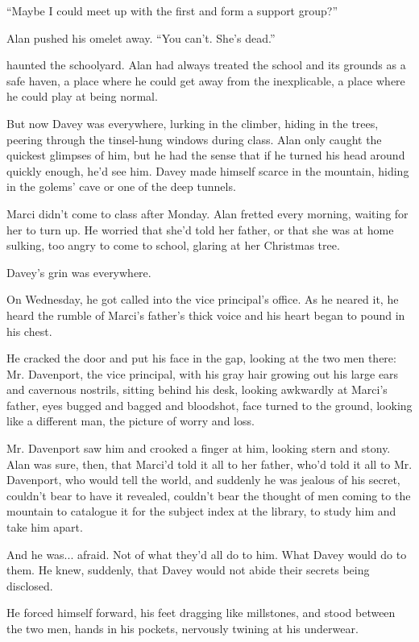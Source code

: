 ``Maybe I could meet up with the first and form a support group?''

Alan pushed his omelet away.  ``You can't.  She's dead.''

 haunted the schoolyard.  Alan had always treated the school and
its grounds as a safe haven, a place where he could get away from the
inexplicable, a place where he could play at being normal.

But now Davey was everywhere, lurking in the climber, hiding in the
trees, peering through the tinsel-hung windows during class.  Alan
only caught the quickest glimpses of him, but he had the sense that if
he turned his head around quickly enough, he'd see him.  Davey made
himself scarce in the mountain, hiding in the golems' cave or one of
the deep tunnels.

Marci didn't come to class after Monday.  Alan fretted every morning,
waiting for her to turn up.  He worried that she'd told her father, or
that she was at home sulking, too angry to come to school, glaring at
her Christmas tree.

Davey's grin was everywhere.

On Wednesday, he got called into the vice principal's office.  As he
neared it, he heard the rumble of Marci's father's thick voice and his
heart began to pound in his chest.

He cracked the door and put his face in the gap, looking at the two
men there:  Mr.  Davenport, the vice principal, with his gray hair
growing out his large ears and cavernous nostrils, sitting behind his
desk, looking awkwardly at Marci's father, eyes bugged and bagged and
bloodshot, face turned to the ground, looking like a different man,
the picture of worry and loss.

Mr.  Davenport saw him and crooked a finger at him, looking stern and
stony.  Alan was sure, then, that Marci'd told it all to her father,
who'd told it all to Mr.  Davenport, who would tell the world, and
suddenly he was jealous of his secret, couldn't bear to have it
revealed, couldn't bear the thought of men coming to the mountain to
catalogue it for the subject index at the library, to study him and
take him apart.

And he was...  afraid.  Not of what they'd all do to him.  What Davey
would do to them.  He knew, suddenly, that Davey would not abide their
secrets being disclosed.

He forced himself forward, his feet dragging like millstones, and
stood between the two men, hands in his pockets, nervously twining at
his underwear.

